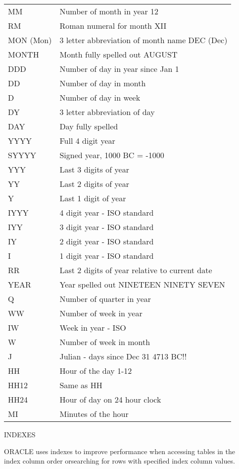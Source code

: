 \begin{flushleft}
\tablefirsthead{}
\tablehead{}
\tabletail{}
\tablelasttail{}
\begin{supertabular}{m{2.531cm}m{12.1cm}}
MM &
Number of month in year  12\\
RM &
Roman numeral for month  XII\\
MON (Mon) &
3 letter abbreviation of month name  DEC (Dec)\\
MONTH &
Month fully spelled out  AUGUST\\
DDD &
Number of day in year since Jan 1\\
DD &
Number of day in month\\
D &
Number of day in week\\
DY &
3 letter abbreviation of day\\
DAY &
Day fully spelled\\
YYYY &
Full 4 digit year\\
SYYYY &
Signed year, 1000 BC = -1000\\
YYY &
Last 3 digits of year\\
YY &
Last 2 digits of year\\
Y &
Last 1 digit of year\\
IYYY &
4 digit year - ISO standard\\
IYY &
3 digit year - ISO standard\\
IY &
2 digit year - ISO standard\\
I &
1 digit year - ISO standard\\
RR &
Last 2 digits of year relative to current date\\
YEAR &
Year spelled out  NINETEEN NINETY SEVEN\\
Q &
Number of quarter in year\\
WW &
Number of week in year\\
IW &
Week in year - ISO\\
W &
Number of week in month\\
J &
Julian - days since Dec 31 4713 BC!!\\
HH &
Hour of the day  1-12\\
HH12 &
Same as HH\\
HH24 &
Hour of day on 24 hour clock\\
MI &
Minutes of the hour\\
\end{supertabular}
\end{flushleft}
INDEXES

ORACLE uses indexes to improve performance when accessing tables in the index column order orsearching for rows with specified index column values.

